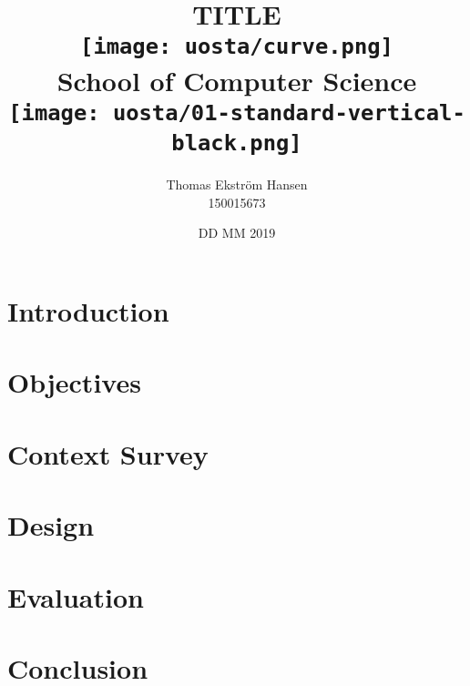 \documentclass[12pt]{report}
\title{
    {TITLE}\\
    \vspace{2cm}
    {\texttt{[image: uosta/curve.png]}}\\
    {\large School of Computer Science}\\
    \vspace{-0.8cm}
    {\texttt{[image: uosta/01-standard-vertical-black.png]}}\\
    \vspace{-2cm}
}
\author{
    {Thomas Ekstr{\" o}m Hansen}\\
    {150015673}
}
\date{DD MM 2019}
\begin{document}
    \maketitle
    
    \tableofcontents
    
    \chapter{Introduction}
    
    
    \chapter{Objectives}
    
    
    \chapter{Context Survey}
    
        
    \chapter{Design}
    
    
    \chapter{Evaluation}
    
        
    \chapter{Conclusion}
    
    
    
    
\end{document}
